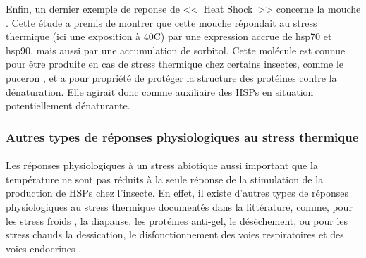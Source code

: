 

		Enfin, un dernier exemple de reponse de <<~Heat Shock~>> concerne la mouche .
		Cette étude a premis de montrer que cette mouche répondait au stress thermique (ici une exposition à 40\textdegree{}C) par une expression accrue de hsp70 et hsp90, mais aussi par une accumulation de sorbitol.
		Cette molécule est connue pour être produite en cas de stress thermique chez certains insectes, comme le puceron \cite{hendrix1998}, et a pour propriété de protéger la structure des protéines contre la dénaturation.
		Elle agirait donc comme auxiliaire des HSPs en situation potentiellement dénaturante.

		\subsubsection{Autres types de réponses physiologiques au stress thermique} %

		\paragraph*{}
		Les réponses physiologiques à un stress abiotique aussi important que la température ne sont pas réduits à la seule réponse de la stimulation de la production de HSPs chez l'insecte.
		En effet, il existe d'autres types de réponses physiologiques au stress thermique documentés dans la littérature, comme, pour les stress froids \cite{clark2008}, la diapause, les protéines anti-gel, le désèchement, ou pour les stress chauds la dessication, le disfonctionnement des voies respiratoires et des voies endocrines \cite{neven2000}.

		\paragraph*{}

